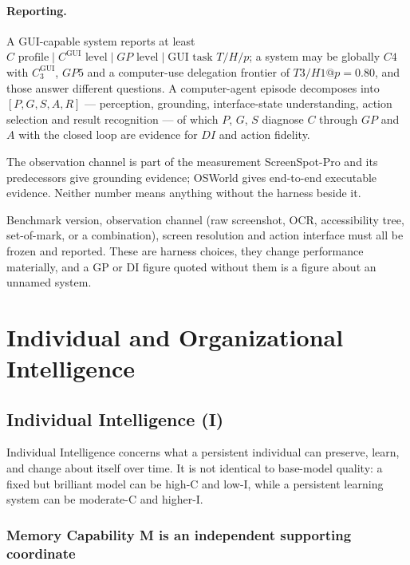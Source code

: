 \documentclass[11pt]{article}
\theoremstyle{definition}
\begin{document}
\paragraph{Reporting.} A GUI-capable system reports at least $C \text{ profile} \mid C^{\mathrm{GUI}} \text{ level} \mid GP \text{ level} \mid \text{GUI task } T/H/p$; a system may be globally $C4$ with $C^{\mathrm{GUI}}_3$, $GP5$ and a computer-use delegation frontier of $T3/H1@p{=}0.80$, and those answer different questions. A computer-agent episode decomposes into $[P, G, S, A, R]$ --- perception, grounding, interface-state understanding, action selection and result recognition --- of which $P$, $G$, $S$ diagnose $C$ through $GP$ and $A$ with the closed loop are evidence for $DI$ and action fidelity.

\begin{cautionbox}{The observation channel is part of the measurement}
ScreenSpot-Pro \citep{li2025screenspotpro} and its predecessors give grounding evidence; OSWorld \citep{xie2024osworld} gives end-to-end executable evidence. Neither number means anything without the harness beside it.

Benchmark version, observation channel (raw screenshot, OCR, accessibility tree, set-of-mark, or a combination), screen resolution and action interface must all be frozen and reported. These are harness choices, they change performance materially, and a GP or DI figure quoted without them is a figure about an unnamed system.
\end{cautionbox}

\section{Individual and Organizational Intelligence}

\subsection{Individual Intelligence (I)}\label{sec:memory}

Individual Intelligence concerns what a persistent individual can preserve, learn, and change about itself over time. It is not identical to base-model quality: a fixed but brilliant model can be high-C and low-I, while a persistent learning system can be moderate-C and higher-I.

\subsubsection{Memory Capability M is an independent supporting coordinate}
\end{document}
